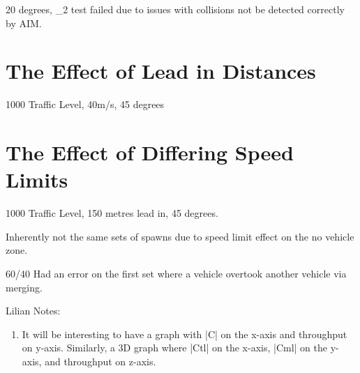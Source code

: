 20 degrees, _2 test failed due to issues with collisions not be detected correctly by AIM.

\section{The Effect of Lead in Distances}
\label{sec:The Effect of Lead in Distances}
1000 Traffic Level, 40m/s, 45 degrees

\section{The Effect of Differing Speed Limits}
\label{sec:The Effect of Differing Speed Limits}
1000 Traffic Level, 150 metres lead in, 45 degrees.

Inherently not the same sets of spawns due to speed limit effect on the no vehicle zone.

60/40 Had an error on the first set where a vehicle overtook another vehicle via merging.

Lilian Notes:
\begin{enumerate}
\item It will be interesting to have a graph with |C| on the x-axis and throughput on y-axis. Similarly, a 3D graph where  |Ctl| on the x-axis, |Cml| on the y-axis, and throughput on z-axis.
\end{enumerate}

